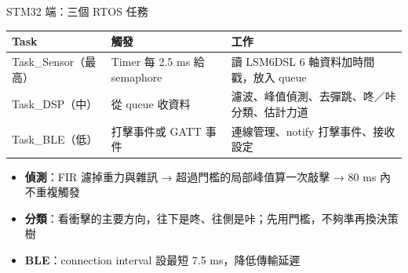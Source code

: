 \documentclass[aspectratio=169, 12pt]{beamer}
\begin{document}
\begin{frame}{STM32 端：三個 RTOS 任務}
\begingroup\footnotesize\begin{tabularx}{\textwidth}{@{}l l Y@{}}
\toprule
Task & 觸發 & 工作 \\
\midrule
Task\_Sensor（最高） & Timer 每 2.5 ms 給 semaphore & 讀 LSM6DSL 6 軸資料加時間戳，放入 queue \\
Task\_DSP（中） & 從 queue 收資料 & 濾波、峰值偵測、去彈跳、咚／咔分類、估計力道 \\
Task\_BLE（低） & 打擊事件或 GATT 事件 & 連線管理、notify 打擊事件、接收設定 \\
\bottomrule
\end{tabularx}\endgroup
\vspace{0.2em}
\begin{itemize}\small
  \item \textbf{偵測}：FIR 濾掉重力與雜訊 → 超過門檻的局部峰值算一次敲擊 → 80 ms 內不重複觸發
  \item \textbf{分類}：看衝擊的主要方向，往下是咚、往側是咔；先用門檻，不夠準再換決策樹
  \item \textbf{BLE}：connection interval 設最短 7.5 ms，降低傳輸延遲
\end{itemize}
\end{frame}
\end{document}
